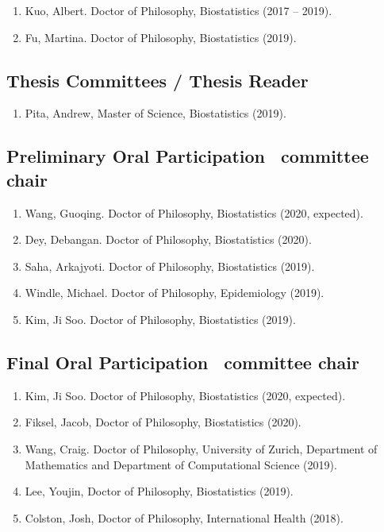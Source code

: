 \documentclass[10pt]{article}
\newcommand{\dn}[1]{{\color{black} {#1}}}
\newcommand{\myben}[1]{\smallskip\begin{enumerate}[start=1,label={\scriptsize \arabic*$\ $},leftmargin=\parindent]\setlength{\itemsep}{#1}\vspace*{-0.7em}}
\newcommand{\ee}{\end{enumerate}}
\newcommand{\mylift}[1]{\vspace*{#1}}
\begin{document}
\myben{-0.1em}

\item Kuo, Albert. Doctor of Philosophy, Biostatistics (2017 -- 2019).
\item Fu, Martina. Doctor of Philosophy, Biostatistics (2019).

\ee

\mylift{-1.5em}

\subsection*{Thesis Committees / Thesis Reader}

\myben{-0.1em}

\item \dn{Pita}, Andrew, Master of Science, Biostatistics (2019).
\ee

\mylift{-1.5em}

\subsection*{Preliminary Oral Participation \ \tiny * committee chair}

\myben{-0.1em}
\item \dn{Wang}, Guoqing. Doctor of Philosophy, Biostatistics (2020, expected).
\item \dn{Dey}, Debangan. Doctor of Philosophy, Biostatistics (2020).
\item \dn{Saha}, Arkajyoti. Doctor of Philosophy, Biostatistics (2019).
\item \dn{Windle}, Michael. Doctor of Philosophy, Epidemiology (2019).
\item \dn{Kim}, Ji Soo. Doctor of Philosophy, Biostatistics (2019).
\ee

\mylift{-1.0em}

\subsection*{Final Oral Participation \ \tiny * committee chair}

\myben{-0.1em}
\item \dn{Kim}, Ji Soo. Doctor of Philosophy, Biostatistics (2020, expected).
\item \dn{Fiksel}, Jacob, Doctor of Philosophy, Biostatistics (2020).
\item \dn{Wang}, Craig. Doctor of Philosophy, University of Zurich, Department of Mathematics and Department of Computational Science (2019).
\item \dn{Lee}, Youjin, Doctor of Philosophy, Biostatistics (2019).
\item \dn{Colston}, Josh, Doctor of Philosophy, International Health (2018).
\ee
\end{document}
